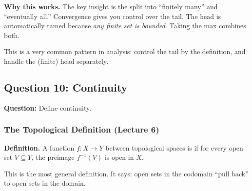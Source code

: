 \documentclass[../master/master.tex]{subfiles}
\begin{document}
\begin{notebox}
\textbf{Why this works.} The key insight is the split into ``finitely many'' and ``eventually all.'' Convergence gives you control over the tail. The head is automatically tamed because \emph{any finite set is bounded}. Taking the max combines both.

This is a very common pattern in analysis: control the tail by the definition, and handle the (finite) head separately.
\end{notebox}

\newpage
\subsection{Question 10: Continuity}

\begin{summarybox}
\textbf{Question:} Define continuity.
\end{summarybox}

\subsubsection*{The Topological Definition (Lecture 6)}

\textbf{Definition.} A function $f : X \to Y$ between topological spaces is  if for every open set $V \subseteq Y$, the preimage $f^{-1}(V)$ is open in $X$.

This is the most general definition. It says: open sets in the codomain ``pull back'' to open sets in the domain.

\begin{center}
\end{center}
\end{document}
